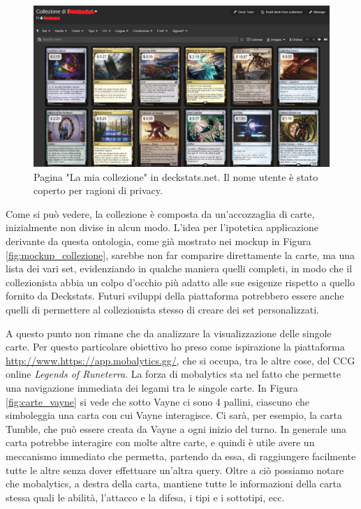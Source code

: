 \documentclass[12pt]{article}
\begin{document}
\begin{figure}[H]
    \centering
         \includegraphics[width=14cm]{files/deckstats_3.png}
    \caption{Pagina "La mia collezione" in deckstats.net. Il nome utente è stato coperto per ragioni di privacy.}
    \label{fig:deckstats_3}
\end{figure}

Come si può vedere, la collezione è composta da un'accozzaglia di carte, inizialmente non divise in alcun modo. L'idea per l'ipotetica applicazione derivante da questa ontologia, come già mostrato nei mockup in Figura \ref{fig:mockup_collezione}, sarebbe non far comparire direttamente la carte, ma  una lista dei vari set, evidenziando in qualche maniera quelli completi, in modo che il collezionista abbia un colpo d'occhio più adatto alle sue esigenze rispetto a quello fornito da Deckstats. Futuri sviluppi della piattaforma potrebbero essere anche quelli di permettere al collezionista stesso di creare dei set personalizzati.


A questo punto non rimane che da analizzare la visualizzazione delle singole carte. Per questo particolare obiettivo ho preso come ispirazione la piattaforma \url{http://www.https://app.mobalytics.gg/}, che si occupa, tra le altre cose, del CCG online \textit{Legends of Runeterra}. \newline
La forza di mobalytics sta nel fatto che permette una navigazione immediata dei legami tra le singole carte. In Figura \ref{fig:carte_vayne} si vede che sotto Vayne ci sono 4 pallini, ciascuno che simboleggia una carta con cui Vayne interagisce. Ci sarà, per esempio, la carta Tumble, che può essere creata da Vayne a ogni inizio del turno. In generale una carta potrebbe interagire con molte altre carte, e quindi è utile avere un meccanismo immediato che permetta, partendo da essa, di raggiungere facilmente tutte le altre senza dover effettuare un'altra query.
Oltre a ciò possiamo notare che mobalytics, a destra della carta, mantiene tutte le informazioni della carta stessa quali le abilità, l'attacco e la difesa, i tipi e i sottotipi, ecc.
\end{document}

